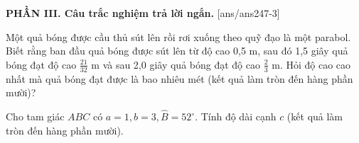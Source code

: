 \documentclass[12pt,a4paper]{article}
\begin{document}
{\bf PHẦN III. Câu trắc nghiệm trả lời ngắn.}
\setcounter{ex}{0}
[ans/ans247-3]
\begin{ex}
 Một quả bóng được cầu thủ sút lên rồi rơi xuống theo quỹ đạo là một parabol. Biết rằng ban đầu quả bóng được sút lên từ độ cao 0,5 m, sau đó 1,5 giây quả bóng đạt độ cao $\frac{21}{32}$ m và sau 2,0 giây quả bóng đạt độ cao $\frac{2}{3}$ m. Hỏi độ cao cao nhất mà quả bóng đạt được là bao nhiêu mét (kết quả làm tròn đến hàng phần mười)?



\end{ex}

\begin{ex}
 Cho tam giác ${ABC}$ có $a=1,b=3, \widehat{B}=52^\circ$. Tính độ dài cạnh ${c}$ (kết quả làm tròn đến hàng phần mười).

\end{ex}
\end{document}
